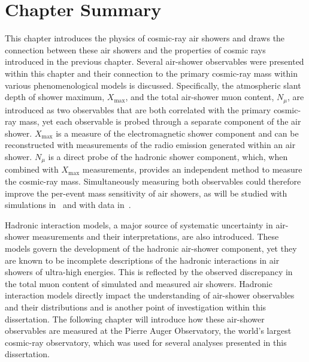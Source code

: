 \section{Chapter Summary}\label{sec:ch2_summary}
This chapter introduces the physics of cosmic-ray air showers and draws the connection between these air showers and the properties of cosmic rays introduced in the previous chapter.
Several air-shower observables were presented within this chapter and their connection to the primary cosmic-ray mass within various phenomenological models is discussed.
Specifically, the atmospheric slant depth of shower maximum, $X_{\text{max}}$, and the total air-shower muon content, $N_{\mu}$, are introduced as two observables that are both correlated with the primary cosmic-ray mass, yet each observable is probed through a separate component of the air shower.
$X_{\text{max}}$ is a measure of the electromagnetic shower component and can be reconstructed with measurements of the radio emission generated within an air shower.
$N_{\mu}$ is a direct probe of the hadronic shower component, which, when combined with $X_{\text{max}}$ measurements, provides an independent method to measure the cosmic-ray mass.
Simultaneously measuring both observables could therefore improve the per-event mass sensitivity of air showers, as will be studied with simulations in~ and with data in~.

Hadronic interaction models, a major source of systematic uncertainty in air-shower measurements and their interpretations, are also introduced.
These models govern the development of the hadronic air-shower component, yet they are known to be incomplete descriptions of the hadronic interactions in air showers of ultra-high energies.
This is reflected by the observed discrepancy in the total muon content of simulated and measured air showers.
Hadronic interaction models directly impact the understanding of air-shower observables and their distributions and is another point of investigation within this dissertation.
The following chapter will introduce how these air-shower observables are measured at the Pierre Auger Observatory, the world's largest cosmic-ray observatory, which was used for several analyses presented in this dissertation.



